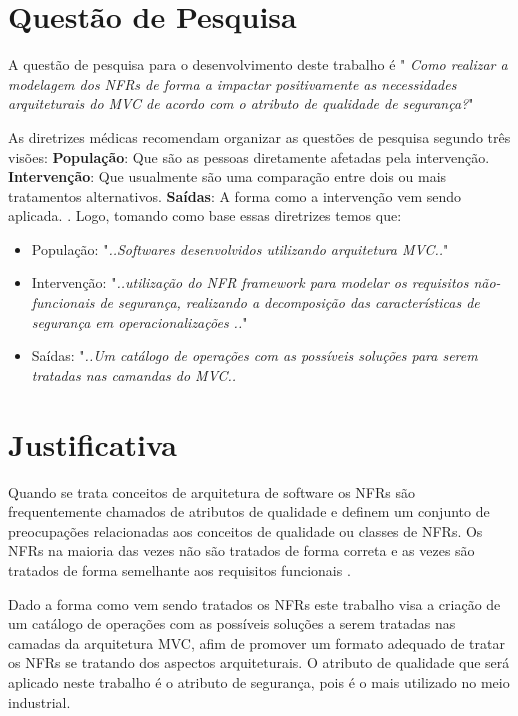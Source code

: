 \section{Questão de Pesquisa}
A questão de pesquisa para o desenvolvimento deste trabalho é " \textit{Como realizar a modelagem dos NFRs de forma a impactar positivamente as necessidades arquiteturais do MVC de acordo com o atributo de qualidade de segurança?}"

As diretrizes médicas recomendam organizar as questões de pesquisa segundo três visões: \textbf{População}: Que são as pessoas diretamente afetadas pela intervenção. \textbf{Intervenção}: Que usualmente são uma comparação entre dois ou mais tratamentos alternativos. \textbf{Saídas}: A forma como a intervenção vem sendo aplicada. \cite{keele2007guidelines}. Logo, tomando como base essas diretrizes temos que: 

\begin{itemize}
	\item População: "\textit{..Softwares desenvolvidos utilizando arquitetura MVC..}"
	\item Intervenção: "\textit{..utilização do NFR framework para modelar os requisitos não-funcionais de segurança, realizando a decomposição das características de segurança em operacionalizações  ..}"
	\item Saídas: "\textit{..Um catálogo de operações com as possíveis soluções para serem tratadas nas camandas do MVC..}
\end{itemize}
\section{Justificativa}

Quando se trata conceitos de arquitetura de software os NFRs são frequentemente chamados de atributos de qualidade e definem um conjunto de preocupações relacionadas aos conceitos de qualidade \cite{schneidewind1990standard} ou classes de NFRs. Os NFRs na maioria das vezes não são tratados de forma correta e as vezes são tratados de forma semelhante aos requisitos funcionais \cite{eckhardt2016non}.

Dado a forma como vem sendo tratados os NFRs este trabalho visa a criação de um catálogo de operações com as possíveis soluções a serem tratadas nas camadas da arquitetura MVC, afim de promover um formato adequado de tratar os NFRs se tratando dos aspectos arquiteturais. O atributo de qualidade que será aplicado neste trabalho é o atributo de segurança, pois é o mais utilizado no meio industrial.  

